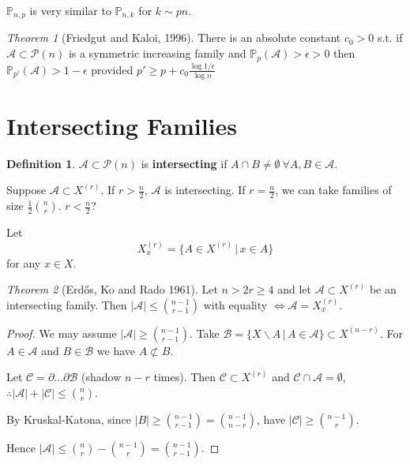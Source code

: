 \documentclass[a4paper]{article}
\theoremstyle{definition}
\newtheorem*{definition}{Definition}
\theoremstyle{remark}
\theoremstyle{default}
\newtheorem{theorem}{Theorem}
\newcommand*\abs[1]{\left|#1\right|}
\begin{document}
$\mathbb{P}_{n, p}$ is very similar to $\mathbb{P}_{n,k}$ for $k \sim pn$.

\begin{theorem}[Friedgut and Kaloi, 1996]
	There is an absolute constant $c_0 > 0$ s.t. if $\mathcal{A} \subset \mathcal{P}(n)$ is a symmetric increasing family and $\mathbb{P}_p(\mathcal{A}) > \epsilon > 0$
	then $\mathbb{P}_{p'}(\mathcal{A}) > 1 - \epsilon$
	provided $p' \geq p + c_0 \frac{\log{1/\epsilon}}{\log{n}}$
\end{theorem}

\section{Intersecting Families}
\setcounter{theorem}{0}
\begin{definition}
	$\mathcal{A} \subset \mathcal{P}(n)$ is \textbf{intersecting} if $A \cap B \neq \emptyset\ \forall A, B \in \mathcal{A}$.
\end{definition}

Suppose $\mathcal{A} \subset X^{(r)}$.
If $r > \frac{n}{2}$, $\mathcal{A}$ is intersecting.
If $r = \frac{n}{2}$, we can take families of size $\frac{1}{2}{n \choose r}$.
$r < \frac{n}{2}$?

Let $$X_x^{(r)} = \{A \in X^{(r)} \,|\, x \in A\}$$ for any $x \in X$.

\begin{theorem}[Erd\H{o}s, Ko and Rado 1961]
	Let $n > 2r \geq 4$ and let $\mathcal{A} \subset X^{(r)}$ be an intersecting family.
	Then $\abs{\mathcal{A}} \leq {n-1 \choose r-1}$ with equality $\iff \mathcal{A} = X_x^{(r)}$.
\end{theorem}
\begin{proof}
	We may assume $\abs{\mathcal{A}} \geq {n-1 \choose r-1}$.
	Take $\mathcal{B} = \{X\backslash A \,|\, A \in \mathcal{A}\} \subset X^{(n-r)}$.
	For $A \in \mathcal{A}$ and $B \in \mathcal{B}$ we have $A \not\subset B$.
	
	Let $\mathcal{C} = \partial \dots \partial \mathcal{B}$ (shadow $n-r$ times).
	Then $\mathcal{C} \subset X^{(r)}$ and $\mathcal{C} \cap \mathcal{A} = \emptyset$,
	$\therefore \abs{\mathcal{A}} + \abs{\mathcal{C}} \leq {n \choose r}$.
	
	By Kruskal-Katona, since $\abs{B} \geq {n-1 \choose r-1} = {n-1 \choose n-r}$,
	have $\abs{\mathcal{C}} \geq {n-1 \choose r}$.
	
	Hence $\abs{\mathcal{A}} \leq {n \choose r} - {n -1 \choose r} = {n-1 \choose r-1}$.
\end{proof}
\end{document}
